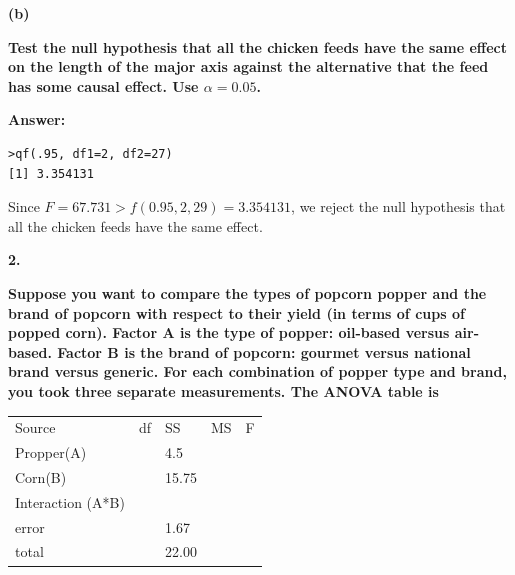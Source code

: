\documentclass[letterpaper,11pt]{article}
\begin{document}
\begin{addmargin}[-1.1em]{0em}
\textbf{(b)}\par\end{addmargin}
  \textbf{Test the null hypothesis that all the chicken feeds have the same effect on the length of the major axis against the alternative that the feed has some causal effect. Use $\alpha = 0.05$.
}\par
\bigbreak

\begin{addmargin}[-0.5em]{0em}
\textbf{Answer: }\end{addmargin}

\begin{lstlisting}
>qf(.95, df1=2, df2=27)
[1] 3.354131
\end{lstlisting}

Since $F = 67.731 > f(0.95, 2, 29) = 3.354131$, we reject the null hypothesis that all the chicken feeds have the same effect.





  \begin{addmargin}[-2em]{0em} \large{\textbf{2. }}\end{addmargin}

  \begin{addmargin}[-1.1em]{0em} \textbf{Suppose you want to compare the types of popcorn popper and the brand of popcorn with respect to their yield (in terms of cups of popped corn). Factor A is the type of popper: oil-based versus air-based. Factor B is the brand of popcorn: gourmet versus national brand versus generic. For each combination of popper type and brand, you took three separate measurements. The ANOVA table is}\par\end{addmargin}

    \begin{center}
    \begin{tabular}{ p{5cm}p{1cm}p{1cm}p{1cm}p{1cm}}
    \centering Source & df & SS & MS & F\\
    \centering Propper(A) & {} & 4.5 & {} &\\
    \centering Corn(B) & {} & 15.75 & {} & {}\\
    \centering Interaction (A*B) & {} & {} & {} & {}\\
    \centering error & {} & 1.67 & {} & {}\\
    \centering total & {} & 22.00 & {} & {}\\
    \end{tabular}
    \end{center}
\end{document}
